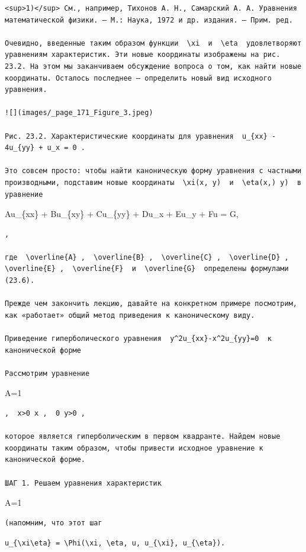 \documentclass[
  ukrainian,
]{article}
\begin{document}
\begin{verbatim}
<sup>1)</sup> См., например, Тихонов А. Н., Самарский А. А. Уравнения математической физики. — М.: Наука, 1972 и др. издания. — Прим. ред.

Очевидно, введенные таким образом функции  \xi  и  \eta  удовлетворяют уравнениям характеристик. Эти новые координаты изображены на рис. 23.2. На этом мы заканчиваем обсуждение вопроса о том, как найти новые координаты. Осталось последнее — определить новый вид исходного уравнения.

![](images/_page_171_Figure_3.jpeg)

Рис. 23.2. Характеристические координаты для уравнения  u_{xx} - 4u_{yy} + u_x = 0 .

Это совсем просто: чтобы найти каноническую форму уравнения с частными производными, подставим новые координаты  \xi(x, y)  и  \eta(x,) y)  в уравнение
\end{verbatim}

Au\_\{xx\} + Bu\_\{xy\} + Cu\_\{yy\} + Du\_x + Eu\_y + Fu = G,

\begin{verbatim}
,

где  \overline{A} ,  \overline{B} ,  \overline{C} ,  \overline{D} ,  \overline{E} ,  \overline{F}  и  \overline{G}  определены формулами (23.6).

Прежде чем закончить лекцию, давайте на конкретном примере посмотрим, как «работает» общий метод приведения к каноническому виду.

Приведение гиперболического уравнения  y^2u_{xx}-x^2u_{yy}=0  к канонической форме

Рассмотрим уравнение
\end{verbatim}

A=1

\begin{verbatim}
,  x>0 x ,  0 y>0 ,

которое является гиперболическим в первом квадранте. Найдем новые координаты таким образом, чтобы привести исходное уравнение к канонической форме.

ШАГ 1. Решаем уравнения характеристик
\end{verbatim}

A=1

\begin{verbatim}
(напомним, что этот шаг
\end{verbatim}

\texttt{u\_\{\textbackslash{}xi\textbackslash{}eta\}\ =\ \textbackslash{}Phi(\textbackslash{}xi,\ \textbackslash{}eta,\ u,\ u\_\{\textbackslash{}xi\},\ u\_\{\textbackslash{}eta\}).}
\end{document}

